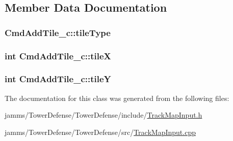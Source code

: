\subsection{Member Data Documentation}
\hypertarget{class_cmd_add_tile__c_a233542914c106180381f9188b6f71a1e}{
\subsubsection[{tile\+Type}]{ Cmd\+Add\+Tile\+\_\+c\+::tile\+Type\hspace{0.3cm}{\ttfamily [private]}}}\label{class_cmd_add_tile__c_a233542914c106180381f9188b6f71a1e}
\hypertarget{class_cmd_add_tile__c_a27acebabf8cf1f1ab573fbe21f386cd9}{
\subsubsection[{tile\+X}]{\setlength{\rightskip}{0pt plus 5cm}int Cmd\+Add\+Tile\+\_\+c\+::tile\+X\hspace{0.3cm}{\ttfamily [private]}}}\label{class_cmd_add_tile__c_a27acebabf8cf1f1ab573fbe21f386cd9}
\hypertarget{class_cmd_add_tile__c_a12e82cc61f89b30d78e9b03999902410}{
\subsubsection[{tile\+Y}]{\setlength{\rightskip}{0pt plus 5cm}int Cmd\+Add\+Tile\+\_\+c\+::tile\+Y\hspace{0.3cm}{\ttfamily [private]}}}\label{class_cmd_add_tile__c_a12e82cc61f89b30d78e9b03999902410}


The documentation for this class was generated from the following files\+:\begin{DoxyCompactItemize}
\item 
jamms/\+Tower\+Defense/\+Tower\+Defense/include/\hyperlink{_track_map_input_8h}{Track\+Map\+Input.\+h}\item 
jamms/\+Tower\+Defense/\+Tower\+Defense/src/\hyperlink{src_2_track_map_input_8cpp}{Track\+Map\+Input.\+cpp}\end{DoxyCompactItemize}

